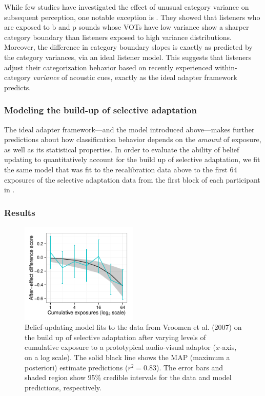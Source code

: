 While few studies have investigated the effect of unusual category variance on subsequent perception, one notable exception is \textcite{Clayards2008}.  They showed that listeners who are exposed to \ph b and \ph p sounds whose VOTs have low variance show a sharper category boundary than listeners exposed to high variance distributions.  Moreover, the difference in category boundary slopes is exactly as predicted by the category variances, via an ideal listener model.  This suggests that listeners adjust their categorization behavior based on recently experienced within-category \emph{variance} of acoustic cues, exactly as the ideal adapter framework predicts.

\subsubsection{Modeling the build-up of selective adaptation}
\label{sec:methods-results}

The ideal adapter framework---and the model introduced above---makes further predictions about how classification behavior depends on the \emph{amount} of exposure, as well as its statistical properties.  In order to evaluate the ability of belief updating to quantitatively account for the build up of selective adaptation, we fit the same model that was fit to the recalibration data above to the first 64 exposures of the selective adaptation data from the first block of each participant in \textcite{Vroomen2007}.

\subsubsection{Results}
\label{sec:results-discussion}

\begin{figure}[htb]
  \centering
  \includegraphics[width=0.5\textwidth]{figure/vroomen-selad-ae-fits-first-64.pdf}
  \caption{Belief-updating model fits to the data from Vroomen et al. (2007) on the build up of selective adaptation after varying levels of cumulative exposure to a prototypical audio-visual adaptor ($x$-axis, on a log scale).  The solid black line shows the MAP (maximum a posteriori) estimate predictions ($r^2=0.83$). The error bars and shaded region show 95\% credible intervals for the data and model predictions, respectively. }
  \label{fig:selad-buildup-preds}
\end{figure}


